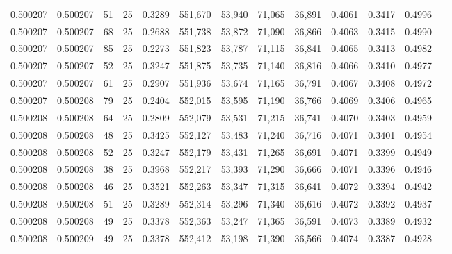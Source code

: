 \begin{tabular}{rrrrrrrrrrrrr}
0.500207 & 0.500207 &    51 &  25 &                                     0.3289 & 551,670 &  53,940 &  71,065 &  36,891 & 0.4061 & 0.3417 & 0.4996 \\
0.500207 & 0.500207 &    68 &  25 &                                     0.2688 & 551,738 &  53,872 &  71,090 &  36,866 & 0.4063 & 0.3415 & 0.4990 \\
0.500207 & 0.500207 &    85 &  25 &                                     0.2273 & 551,823 &  53,787 &  71,115 &  36,841 & 0.4065 & 0.3413 & 0.4982 \\
0.500207 & 0.500207 &    52 &  25 &                                     0.3247 & 551,875 &  53,735 &  71,140 &  36,816 & 0.4066 & 0.3410 & 0.4977 \\
0.500207 & 0.500207 &    61 &  25 &                                     0.2907 & 551,936 &  53,674 &  71,165 &  36,791 & 0.4067 & 0.3408 & 0.4972 \\
0.500207 & 0.500208 &    79 &  25 &                                     0.2404 & 552,015 &  53,595 &  71,190 &  36,766 & 0.4069 & 0.3406 & 0.4965 \\
0.500208 & 0.500208 &    64 &  25 &                                     0.2809 & 552,079 &  53,531 &  71,215 &  36,741 & 0.4070 & 0.3403 & 0.4959 \\
0.500208 & 0.500208 &    48 &  25 &                                     0.3425 & 552,127 &  53,483 &  71,240 &  36,716 & 0.4071 & 0.3401 & 0.4954 \\
0.500208 & 0.500208 &    52 &  25 &                                     0.3247 & 552,179 &  53,431 &  71,265 &  36,691 & 0.4071 & 0.3399 & 0.4949 \\
0.500208 & 0.500208 &    38 &  25 &                                     0.3968 & 552,217 &  53,393 &  71,290 &  36,666 & 0.4071 & 0.3396 & 0.4946 \\
0.500208 & 0.500208 &    46 &  25 &                                     0.3521 & 552,263 &  53,347 &  71,315 &  36,641 & 0.4072 & 0.3394 & 0.4942 \\
0.500208 & 0.500208 &    51 &  25 &                                     0.3289 & 552,314 &  53,296 &  71,340 &  36,616 & 0.4072 & 0.3392 & 0.4937 \\
0.500208 & 0.500208 &    49 &  25 &                                     0.3378 & 552,363 &  53,247 &  71,365 &  36,591 & 0.4073 & 0.3389 & 0.4932 \\
0.500208 & 0.500209 &    49 &  25 &                                     0.3378 & 552,412 &  53,198 &  71,390 &  36,566 & 0.4074 & 0.3387 & 0.4928 \\

\end{tabular}
